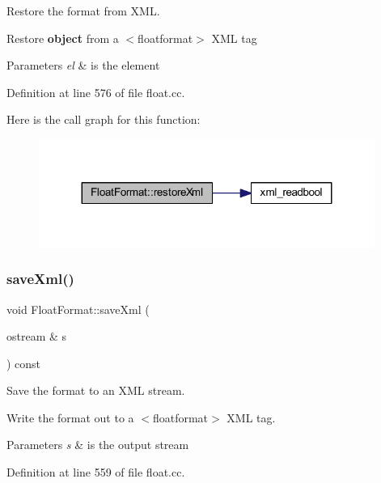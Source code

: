 Restore the format from X\+ML. 

Restore {\bfseries{object}} from a $<$floatformat$>$ X\+ML tag 
\begin{DoxyParams}{Parameters}
{\em el} & is the element \\
\hline
\end{DoxyParams}


Definition at line 576 of file float.\+cc.

Here is the call graph for this function\+:
\nopagebreak
\begin{figure}[H]
\begin{center}
\leavevmode
\includegraphics[width=311pt]{class_float_format_aa6e0b189a1a66251b200fcf829d98356_cgraph}
\end{center}
\end{figure}
\mbox{\label{class_float_format_adc679e89dcd8c63b0b9cc08f3464ba1a}} 
\subsubsection{\texorpdfstring{saveXml()}{saveXml()}}
{\footnotesize\ttfamily void Float\+Format\+::save\+Xml (\begin{DoxyParamCaption}\item[{ostream \&}]{s }\end{DoxyParamCaption}) const}



Save the format to an X\+ML stream. 

Write the format out to a $<$floatformat$>$ X\+ML tag. 
\begin{DoxyParams}{Parameters}
{\em s} & is the output stream \\
\hline
\end{DoxyParams}


Definition at line 559 of file float.\+cc.

